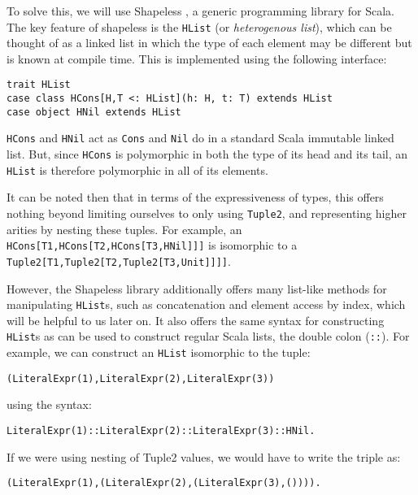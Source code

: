 To solve this, we will use Shapeless \cite{shapeless}, a generic programming library for Scala. The key feature of shapeless is the \lstinline{HList} (or \textit{heterogenous list}), which can be thought of as a linked list in which the type of each element may be different but is known at compile time. This is implemented using the following interface:
\vs\begin{lstlisting}
trait HList
case class HCons[H,T <: HList](h: H, t: T) extends HList
case object HNil extends HList
\end{lstlisting}\vs
\lstinline{HCons} and \lstinline{HNil} act as \lstinline{Cons} and \lstinline{Nil} do in a standard Scala immutable linked list. But, since \lstinline{HCons} is polymorphic in both the type of its head and its tail, an \lstinline{HList} is therefore polymorphic in all of its elements.

It can be noted then that in terms of the expressiveness of types, this offers nothing beyond limiting ourselves to only using \lstinline{Tuple2}, and representing higher arities by nesting these tuples. For example, an \lstinline{HCons[T1,HCons[T2,HCons[T3,HNil]]]} is isomorphic to a \lstinline{Tuple2[T1,Tuple2[T2,Tuple2[T3,Unit]]]]}.

However, the Shapeless library additionally offers many list-like methods for manipulating \lstinline{HList}s, such as concatenation and element access by index, which will be helpful to us later on. It also offers the same syntax for constructing \lstinline{HList}s as can be used to construct regular Scala lists, the double colon (\lstinline{::}). For example, we can construct an \lstinline{HList} isomorphic to the tuple:
\vs\begin{lstlisting}
(LiteralExpr(1),LiteralExpr(2),LiteralExpr(3))
\end{lstlisting}\vs
using the syntax:
\vs\begin{lstlisting}
LiteralExpr(1)::LiteralExpr(2)::LiteralExpr(3)::HNil.
\end{lstlisting}\vs
If we were using nesting of Tuple2 values, we would have to write the triple as:
\vs\begin{lstlisting}
(LiteralExpr(1),(LiteralExpr(2),(LiteralExpr(3),()))).
\end{lstlisting}\vs


